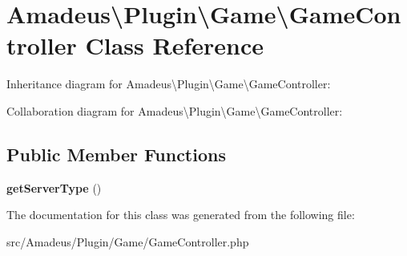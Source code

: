 \hypertarget{classAmadeus_1_1Plugin_1_1Game_1_1GameController}{}\section{Amadeus\textbackslash{}Plugin\textbackslash{}Game\textbackslash{}Game\+Controller Class Reference}
\label{classAmadeus_1_1Plugin_1_1Game_1_1GameController}


Inheritance diagram for Amadeus\textbackslash{}Plugin\textbackslash{}Game\textbackslash{}Game\+Controller\+:


Collaboration diagram for Amadeus\textbackslash{}Plugin\textbackslash{}Game\textbackslash{}Game\+Controller\+:
\subsection*{Public Member Functions}
\begin{DoxyCompactItemize}
\item 
\mbox{\label{classAmadeus_1_1Plugin_1_1Game_1_1GameController_ada940f8fef6881eeeef1f3c40595ce41}} 
{\bfseries get\+Server\+Type} ()
\end{DoxyCompactItemize}


The documentation for this class was generated from the following file\+:\begin{DoxyCompactItemize}
\item 
src/\+Amadeus/\+Plugin/\+Game/Game\+Controller.\+php\end{DoxyCompactItemize}
